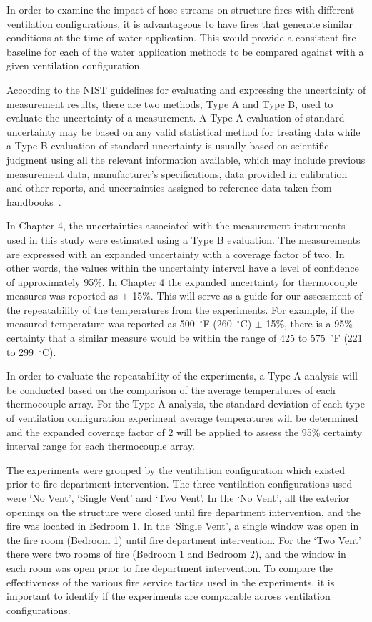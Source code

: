\documentclass[12pt,oneside]{book}
\begin{document}
In order to examine the impact of hose streams on structure fires with different ventilation configurations, it is advantageous to have fires that generate similar conditions at the time of water application.  This would provide a consistent fire baseline for each of the water application methods to be compared against with a given ventilation configuration.

According to the NIST guidelines for evaluating and expressing the uncertainty of measurement results, there are two methods, Type A and Type B, used to evaluate the uncertainty of a measurement.  A Type A evaluation of standard uncertainty may be based on any valid statistical method for treating data while a Type B evaluation of standard uncertainty is usually based on scientific judgment using all the relevant information available, which may include previous measurement data, manufacturer's specifications, data provided in calibration and other reports, and uncertainties assigned to reference data taken from handbooks~\cite{Taylor&Kuyatt:1994}.     

In Chapter 4, the uncertainties associated with the measurement instruments used in this study were estimated using a Type B evaluation. The measurements are expressed with an expanded uncertainty with a coverage factor of two.  In other words, the values within the uncertainty interval have a level of confidence of approximately 95\%.  In Chapter 4 the expanded uncertainty for thermocouple measures was reported as $\pm$ 15\%. This will serve as a guide for our assessment of the repeatability of the temperatures from the experiments. For example, if the measured temperature was reported as 500~$^\circ$F (260~$^\circ$C) $\pm$ 15\%, there is a 95\% certainty that a similar measure would be within the range of 425 to 575~$^\circ$F (221 to 299~$^\circ$C).  

In order to evaluate the repeatability of the experiments, a Type A analysis will be conducted based on the comparison of the average temperatures of each thermocouple array.
For the Type A analysis, the standard deviation of each type of ventilation configuration experiment average temperatures will be determined and the expanded coverage factor of 2 will be applied to assess the 95\% certainty interval range for each thermocouple array.  

The experiments were grouped by the ventilation configuration which existed prior to fire department intervention. The three ventilation configurations used were `No Vent', `Single Vent' and `Two Vent'. In the `No Vent', all the exterior openings on the structure were closed until fire department intervention, and the fire was located in Bedroom 1. In the `Single Vent', a single window was open in the fire room (Bedroom 1) until fire department intervention. For the `Two Vent' there were two rooms of fire (Bedroom 1 and Bedroom 2), and the window in each room was open prior to fire department intervention. To compare the effectiveness of the various fire service tactics used in the experiments, it is important to identify if the experiments are comparable across ventilation configurations. 
\end{document}
